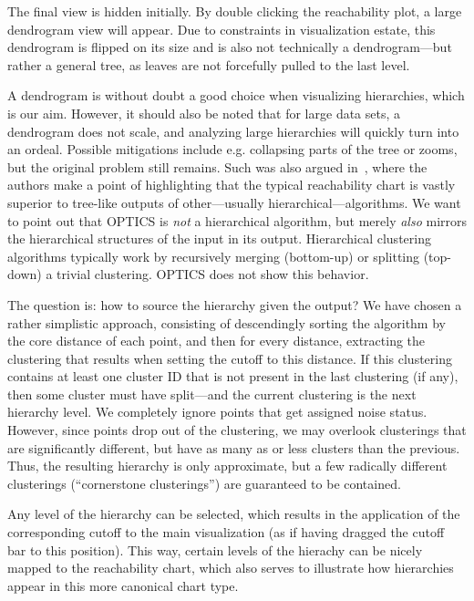 \documentclass{vgtc}                          %
\begin{document}
The final view is hidden initially. By double clicking the reachability plot, a
large dendrogram view will appear. Due to constraints in visualization estate,
this dendrogram is flipped on its size and is also not technically a dendrogram---but
rather a general tree, as leaves are not forcefully pulled to the last level.

A dendrogram is without doubt a good choice when visualizing hierarchies, which
is our aim. However, it should also be noted that for large data sets, a
dendrogram does not scale, and analyzing large hierarchies will quickly turn
into an ordeal.  Possible mitigations include e.g. collapsing parts of the tree
or zooms, but the original problem still remains. Such was also argued
in~\cite{optics}, where the authors make a point of highlighting that the
typical reachability chart is vastly superior to tree-like outputs of
other---usually hierarchical---algorithms. We want to point out that OPTICS is
\emph{not} a hierarchical algorithm, but merely \emph{also} mirrors the
hierarchical structures of the input in its output. Hierarchical clustering
algorithms typically work by recursively merging (bottom-up) or splitting
(top-down) a trivial clustering.  OPTICS does not show this behavior.

The question is: how to source the hierarchy given the output? We have chosen a
rather simplistic approach, consisting of descendingly sorting the algorithm by
the core distance of each point, and then for every distance, extracting the
clustering that results when setting the cutoff to this distance. If this
clustering contains at least one cluster ID that is not present in the last
clustering (if any), then some cluster must have split---and the current
clustering is the next hierarchy level.  We completely ignore points that get
assigned noise status.  However, since points drop out of the clustering, we
may overlook clusterings that are significantly different, but have as many as
or less clusters than the previous. Thus, the resulting hierarchy is only
approximate, but a few radically different clusterings (``cornerstone
clusterings'') are guaranteed to be contained.

Any level of the hierarchy can be selected, which results in the application of
the corresponding cutoff to the main visualization (as if having dragged the
cutoff bar to this position). This way, certain levels of the hierachy can be
nicely mapped to the reachability chart, which also serves to illustrate how
hierarchies appear in this more canonical chart type.
\end{document}
